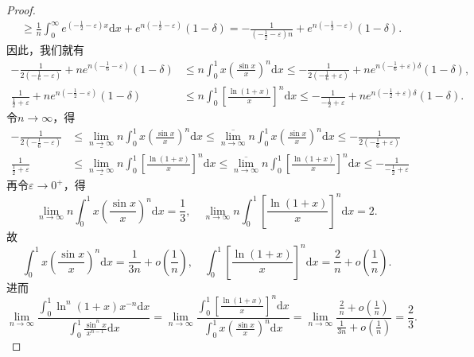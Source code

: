 \documentclass[../../main.tex]{subfiles}
\begin{document}
\begin{proof}
\begin{align*}
&\geqslant \frac{1}{n}\int_0^{\infty}{e^{\left( -\frac{1}{2}-\varepsilon \right) x}\mathrm{d}x}+e^{n\left( -\frac{1}{2}-\varepsilon \right)}\left( 1-\delta \right) =-\frac{1}{\left( -\frac{1}{2}-\varepsilon \right) n}+e^{n\left( -\frac{1}{2}-\varepsilon \right)}\left( 1-\delta \right) .
\end{align*}
因此，我们就有
\begin{align*}
-\frac{1}{2\left( -\frac{1}{6}-\varepsilon \right)}+ne^{n\left( -\frac{1}{6}-\varepsilon \right)}\left( 1-\delta \right) &\leqslant n\int_0^1{x\left( \frac{\sin x}{x} \right) ^n\mathrm{d}x}\leqslant -\frac{1}{2\left( -\frac{1}{6}+\varepsilon \right)}+ne^{n\left( -\frac{1}{6}+\varepsilon \right) \delta}\left( 1-\delta \right) ,\\
\frac{1}{\frac{1}{2}+\varepsilon}+ne^{n\left( -\frac{1}{2}-\varepsilon \right)}\left( 1-\delta \right) &\leqslant n\int_0^1{\left[ \frac{\ln \left( 1+x \right)}{x} \right] ^n\mathrm{d}x}\leqslant -\frac{1}{-\frac{1}{2}+\varepsilon}+ne^{n\left( -\frac{1}{2}+\varepsilon \right) \delta}\left( 1-\delta \right) .
\end{align*}
令$n\rightarrow \infty$，得
\begin{align*}
-\frac{1}{2\left( -\frac{1}{6}-\varepsilon \right)}&\leqslant \underline{\lim\limits_{n\rightarrow \infty}}n\int_0^1{x\left( \frac{\sin x}{x} \right) ^n\mathrm{d}x}\leqslant \overline{\lim\limits_{n\rightarrow \infty}}n\int_0^1{x\left( \frac{\sin x}{x} \right) ^n\mathrm{d}x}\leqslant -\frac{1}{2\left( -\frac{1}{6}+\varepsilon \right)}\\
\frac{1}{\frac{1}{2}+\varepsilon}&\leqslant \underline{\lim\limits_{n\rightarrow \infty}}n\int_0^1{\left[ \frac{\ln \left( 1+x \right)}{x} \right] ^n\mathrm{d}x}\leqslant \overline{\lim\limits_{n\rightarrow \infty}}n\int_0^1{\left[ \frac{\ln \left( 1+x \right)}{x} \right] ^n\mathrm{d}x}\leqslant -\frac{1}{-\frac{1}{2}+\varepsilon}
\end{align*}
再令$\varepsilon \rightarrow 0^+$，得
\[
\lim\limits_{n\rightarrow \infty}n\int_0^1{x\left( \frac{\sin x}{x} \right) ^n\mathrm{d}x}=\frac{1}{3},\quad \lim\limits_{n\rightarrow \infty}n\int_0^1{\left[ \frac{\ln \left( 1+x \right)}{x} \right] ^n\mathrm{d}x}=2.
\]
故
\[
\int_0^1{x\left( \frac{\sin x}{x} \right) ^n\mathrm{d}x}=\frac{1}{3n}+o\left( \frac{1}{n} \right) ,\quad \int_0^1{\left[ \frac{\ln \left( 1+x \right)}{x} \right] ^n\mathrm{d}x}=\frac{2}{n}+o\left( \frac{1}{n} \right) .
\]
进而
\[
\lim\limits_{n\rightarrow \infty}\frac{\int_0^1{\ln ^n(1 + x)x^{-n}\mathrm{d}x}}{\int_0^1{\frac{\sin ^nx}{x^{n-1}}\mathrm{d}x}}=\lim\limits_{n\rightarrow \infty}\frac{\int_0^1{\left[ \frac{\ln \left( 1+x \right)}{x} \right] ^n\mathrm{d}x}}{\int_0^1{x\left( \frac{\sin x}{x} \right) ^n\mathrm{d}x}}=\lim\limits_{n\rightarrow \infty}\frac{\frac{2}{n}+o\left( \frac{1}{n} \right)}{\frac{1}{3n}+o\left( \frac{1}{n} \right)}=\frac{2}{3}.
\]

\end{proof}
\end{document}
